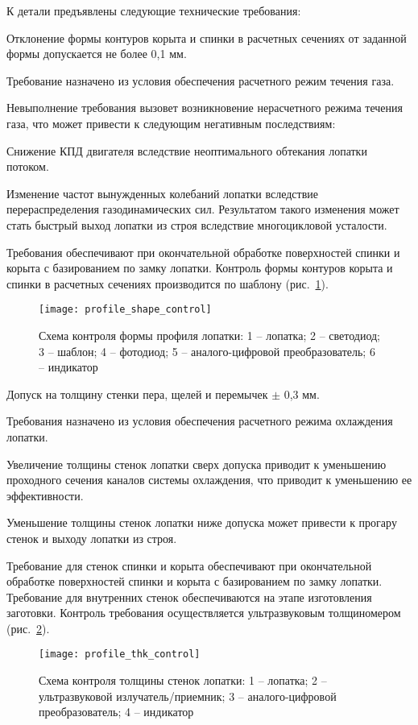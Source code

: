К детали предъявлены следующие технические требования:

Отклонение формы контуров корыта и спинки в расчетных сечениях от заданной формы допускается не более 0,1 мм.

Требование назначено из условия обеспечения расчетного режим течения газа.

Невыполнение требования вызовет возникновение нерасчетного режима течения газа, что может привести к следующим негативным последствиям:

Снижение КПД двигателя вследствие неоптимального обтекания лопатки потоком.

Изменение частот вынужденных колебаний лопатки вследствие перераспределения газодинамических сил. Результатом такого изменения может стать быстрый выход лопатки из строя вследствие многоцикловой усталости.

Требования обеспечивают при окончательной обработке поверхностей спинки и корыта с базированием по замку лопатки.
Контроль формы контуров корыта и спинки в расчетных сечениях производится по шаблону (рис.~\ref{img:profile_shape_control}).

\begin{figure}[H]
	\centering
	\texttt{[image: profile\_shape\_control]}
	\caption{Схема контроля формы профиля лопатки: 1 – лопатка; 2 – светодиод; 3 – шаблон; 4 – фотодиод; 5 –
	аналого-цифровой преобразователь; 6 – индикатор}
	\label{img:profile_shape_control}
\end{figure}

Допуск на  толщину стенки пера, щелей и перемычек $\pm$ 0,3 мм.

Требования назначено из условия обеспечения расчетного режима охлаждения лопатки.

Увеличение толщины стенок лопатки сверх допуска приводит к уменьшению проходного сечения каналов системы охлаждения, что приводит к уменьшению ее эффективности.

Уменьшение толщины стенок лопатки ниже допуска может привести к прогару стенок и выходу лопатки из строя.

Требование для стенок спинки и корыта обеспечивают при окончательной обработке поверхностей спинки и корыта с базированием по замку лопатки. Требование для внутренних стенок обеспечиваются на этапе изготовления заготовки.
Контроль требования осуществляется ультразвуковым толщиномером (рис.~\ref{img:profile_thk_control}).

\begin{figure}[H]
	\centering
	\texttt{[image: profile\_thk\_control]}
	\caption{Схема контроля толщины стенок лопатки: 1 – лопатка; 2 – ультразвуковой излучатель/приемник; 3 –
	аналого-цифровой преобразователь; 4 – индикатор}
	\label{img:profile_thk_control}
\end{figure}

